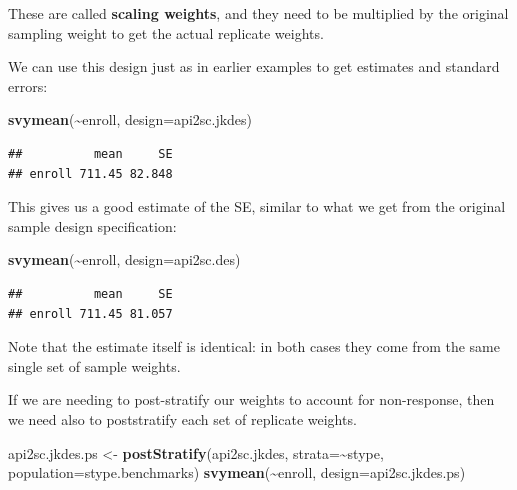 \documentclass[
]{book}
\newenvironment{Shaded}{\begin{snugshade}}{\end{snugshade}}
\newcommand{\AttributeTok}[1]{\textcolor[rgb]{0.13,0.29,0.53}{#1}}
\newcommand{\FunctionTok}[1]{\textcolor[rgb]{0.13,0.29,0.53}{\textbf{#1}}}
\newcommand{\NormalTok}[1]{#1}
\newcommand{\OtherTok}[1]{\textcolor[rgb]{0.56,0.35,0.01}{#1}}
\newcommand{\SpecialCharTok}[1]{\textcolor[rgb]{0.81,0.36,0.00}{\textbf{#1}}}
\begin{document}
These are called \textbf{scaling weights}, and they need to be multiplied by the
original sampling weight to get the actual replicate weights.

We can use this design just as in earlier examples to get estimates and standard errors:

\begin{Shaded}
\begin{Highlighting}[]
\FunctionTok{svymean}\NormalTok{(}\SpecialCharTok{\textasciitilde{}}\NormalTok{enroll, }\AttributeTok{design=}\NormalTok{api2sc.jkdes)}
\end{Highlighting}
\end{Shaded}

\begin{verbatim}
##          mean     SE
## enroll 711.45 82.848
\end{verbatim}

This gives us a good estimate of the SE, similar to what we get from the original
sample design specification:

\begin{Shaded}
\begin{Highlighting}[]
\FunctionTok{svymean}\NormalTok{(}\SpecialCharTok{\textasciitilde{}}\NormalTok{enroll, }\AttributeTok{design=}\NormalTok{api2sc.des)}
\end{Highlighting}
\end{Shaded}

\begin{verbatim}
##          mean     SE
## enroll 711.45 81.057
\end{verbatim}

Note that the estimate itself is identical: in both cases they come from the same single set
of sample weights.

If we are needing to post-stratify our weights to account for non-response, then
we need also to poststratify each set of replicate weights.

\begin{Shaded}
\begin{Highlighting}[]
\NormalTok{api2sc.jkdes.ps }\OtherTok{\textless{}{-}} \FunctionTok{postStratify}\NormalTok{(api2sc.jkdes, }\AttributeTok{strata=}\SpecialCharTok{\textasciitilde{}}\NormalTok{stype, }\AttributeTok{population=}\NormalTok{stype.benchmarks)}
\FunctionTok{svymean}\NormalTok{(}\SpecialCharTok{\textasciitilde{}}\NormalTok{enroll, }\AttributeTok{design=}\NormalTok{api2sc.jkdes.ps)}
\end{Highlighting}
\end{Shaded}
\end{document}

